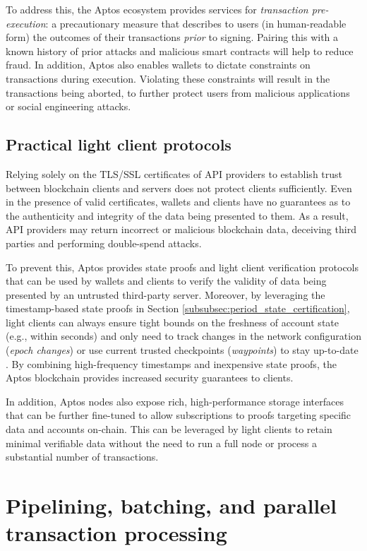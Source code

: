 \documentclass{article}
\begin{document}
To address this, the Aptos ecosystem provides services for \emph{transaction pre-execution}: a precautionary measure that describes to users (in human-readable form) the outcomes of their transactions \emph{prior} to signing. Pairing this with a known history of prior attacks and malicious smart contracts will help to reduce fraud. In addition, Aptos also enables wallets to dictate constraints on transactions during execution. Violating these constraints will result in the transactions being aborted, to further protect users from malicious applications or social engineering attacks.

\subsection{Practical light client protocols}
Relying solely on the TLS/SSL certificates of API providers to establish trust between blockchain clients and servers does not protect clients sufficiently. Even in the presence of valid certificates, wallets and clients have no guarantees as to the authenticity and integrity of the data being presented to them. As a result, API providers may return incorrect or malicious blockchain data, deceiving third parties and performing double-spend attacks.

To prevent this, Aptos provides state proofs and light client verification protocols that can be used by wallets and clients to verify the validity of data being presented by an untrusted third-party server. Moreover, by leveraging the timestamp-based state proofs in Section \ref{subsubsec:period_state_certification}, light clients can always ensure tight bounds on the freshness of account state (e.g., within seconds) and only need to track changes in the network configuration (\emph{epoch changes}) or use current trusted checkpoints (\emph{waypoints}) to stay up-to-date \cite{waypoints}. By combining high-frequency timestamps and inexpensive state proofs, the Aptos blockchain provides increased security guarantees to clients. 

In addition, Aptos nodes also expose rich, high-performance storage interfaces that can be further fine-tuned to allow subscriptions to proofs targeting specific data and accounts on-chain. This can be leveraged by light clients to retain minimal verifiable data without the need to run a full node or process a substantial number of transactions.

\section{Pipelining, batching, and parallel transaction processing}
\label{sec:pipelining_batching}
\end{document}

